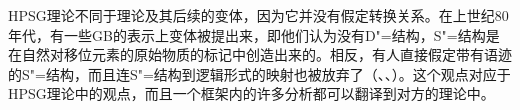 HPSG理论不同于\gb 理论及其后续的变体，因为它并没有假定转换关系。在上世纪80年代，有一些GB的表示上变体被提出来，即他们认为没有D"=结构，S"=结构是在自然对移位元素的原始物质的标记中创造出来的。相反，有人直接假定带有语迹的S"=结构，而且连S"=结构到逻辑形式的映射也被放弃了（\citealp{Koster78b-u}、\citealp[Section~1.4]{Haider93a}、\citealp[]{Frey93a}）。这个观点对应于HPSG理论中的观点，而且一个框架内的许多分析都可以翻译到对方的理论中。

